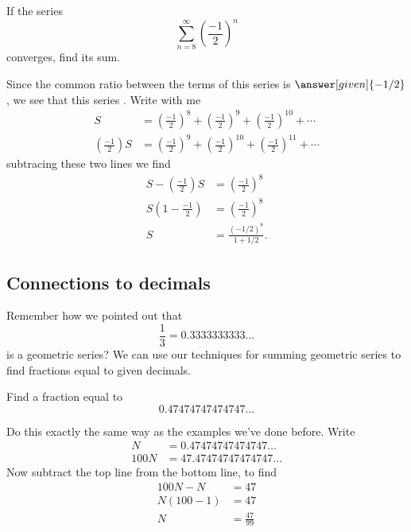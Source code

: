 \documentclass{ximera}
\begin{document}
\begin{example}
If the series 
\[
\sum_{n=8}^\infty \left(\frac{-1}{2}\right)^n
\]
converges, find its sum.
\begin{explanation}
  Since the common ratio between the terms of this series is
$\answer[given]{-1/2}$, we see that this series
. Write with me
\begin{align*}
  S &= \left(\frac{-1}{2}\right)^{8} + \left(\frac{-1}{2}\right)^{9} + \left(\frac{-1}{2}\right)^{10} + \cdots\\
  \left(\frac{-1}{2}\right) S &= \left(\frac{-1}{2}\right)^{9} + \left(\frac{-1}{2}\right)^{10} + \left(\frac{-1}{2}\right)^{11} + \cdots
\end{align*}
subtracing these two lines we find
\begin{align*}
  S -  \left(\frac{-1}{2}\right) S  &= \left(\frac{-1}{2}\right)^{8}\\
  S\left(1-\frac{-1}{2}\right) &= \left(\frac{-1}{2}\right)^{8}\\
  S &= \frac{(-1/2)^{8}}{1+1/2}.
\end{align*}
\end{explanation}
\end{example}


\subsection{Connections to decimals}

Remember how we pointed out that 
\[
\frac{1}{3} = 0.3333333333\dots
\]
is a geometric series? We can use our techniques for summing geometric
series to find fractions equal to given decimals.

\begin{example}
  Find a fraction equal to
  \[
  0.47474747474747\dots
  \]
  \begin{explanation}
    Do this exactly the same way as the examples we've done
    before. Write
    \begin{align*}
    N &=      0.47474747474747\dots\\
    100 N &= 47.47474747474747\dots
    \end{align*}
    Now subtract the top line from the bottom line, to find
    \begin{align*}
      100N - N &= 47\\
      N(100-1) &= 47\\
      N &= \frac{47}{99}
    \end{align*}
  \end{explanation}
\end{example}
\end{document}
